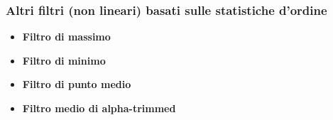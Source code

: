 \subsubsection{Altri filtri (non lineari) basati sulle statistiche d’ordine}
\begin{itemize}
    \item \textbf{Filtro di massimo}
    \item \textbf{Filtro di minimo}
    \item \textbf{Filtro di punto medio}
    \item \textbf{Filtro medio di alpha-trimmed}
\end{itemize}
